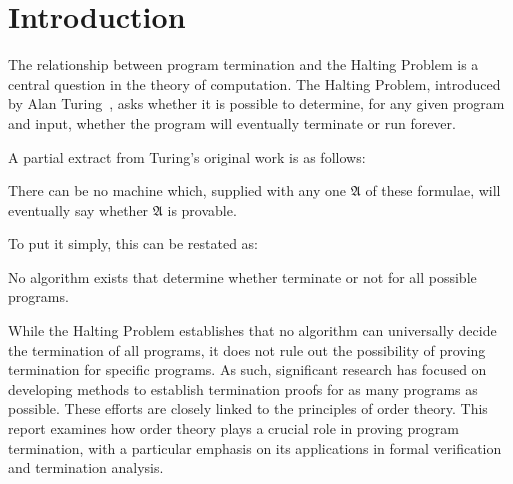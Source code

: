 \section{Introduction}
\label{sec:intro}
The relationship between program termination and the Halting Problem is a central question in the theory of computation.
The Halting Problem, introduced by Alan Turing~\cite{turing}, asks whether it is possible to determine, for any given program and input, whether the program will eventually terminate or run forever.

A partial extract from Turing's original work is as follows:
\begin{theorem}
    There can be no machine which, supplied with any one
$\mathfrak{A}$ of these formulae, will eventually say whether $\mathfrak{A}$ is provable.
\end{theorem}
To put it simply, this can be restated as:
\begin{theorem}
    No algorithm exists that determine whether terminate or not for all possible programs.
\end{theorem}

While the Halting Problem establishes that no algorithm can universally decide the termination of all programs, it does not rule out the possibility of proving termination for specific programs.
As such, significant research has focused on developing methods to establish termination proofs for as many programs as possible.
These efforts are closely linked to the principles of order theory.
This report examines how order theory plays a crucial role in proving program termination, with a particular emphasis on its applications in formal verification and termination analysis.
